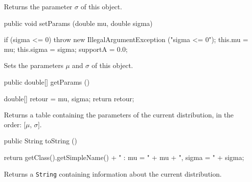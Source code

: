   \begin{tabb}  Returns the parameter $\sigma$ of this object.
  \end{tabb}
\begin{code}

   public void setParams (double mu, double sigma)\begin{hide} {
      if (sigma <= 0)
         throw new IllegalArgumentException ("sigma <= 0");
      this.mu = mu;
      this.sigma = sigma;
      supportA = 0.0;
   }\end{hide}
\end{code}
  \begin{tabb}  Sets the parameters $\mu$ and $\sigma$ of this object.
  \end{tabb}
\begin{code}

   public double[] getParams ()\begin{hide} {
      double[] retour = {mu, sigma};
      return retour;
   }\end{hide}
\end{code}
\begin{tabb}
   Returns a table containing the parameters of the current distribution,
   in the order: [$\mu$, $\sigma$].
\end{tabb}
\begin{hide}\begin{code}

   public String toString ()\begin{hide} {
      return getClass().getSimpleName() + " : mu = " + mu + ", sigma = " + sigma;
   }\end{hide}
\end{code}
\begin{tabb}
   Returns a \texttt{String} containing information about the current distribution.
\end{tabb}\end{hide}
\begin{code}\begin{hide}
}\end{hide}
\end{code}

